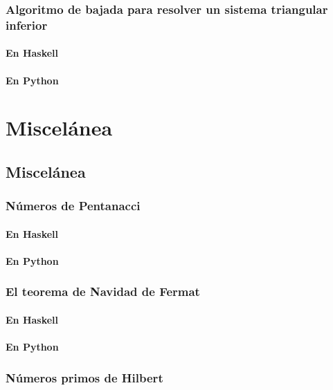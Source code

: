 \documentclass[a4paper,12pt,twoside]{book}
\begin{document}
\section{Algoritmo de bajada para resolver un sistema triangular inferior}
\subsection{En Haskell}
\subsection{En Python}

\part{Miscelánea}

\chapter{Miscelánea}

\minitoc

\section{Números de Pentanacci}
\subsection{En Haskell}
\subsection{En Python}

\section{El teorema de Navidad de Fermat}
\subsection{En Haskell}
\subsection{En Python}

\section{Números primos de Hilbert}
\end{document}
